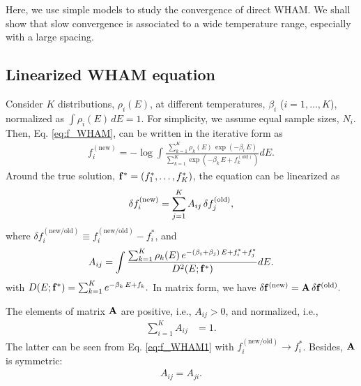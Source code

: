 \documentclass[reprint,aip,jcp,superscriptaddress]{revtex4-1}
\begin{document}
Here, we use simple models
to study the convergence of direct WHAM.
%
We shall show that
slow convergence is
associated to a wide temperature range,
especially with a large spacing.





\subsection{Linearized WHAM equation}



Consider $K$ distributions, $\rho_i(E)$,
at different temperatures,
$\beta_i$ ($i = 1, \dots, K$),
%
normalized as
%
$
\int \rho_i(E) \, dE = 1.
$
%
%
%
For simplicity,
we assume equal sample sizes, $N_i$.
%
Then,
Eq. \eqref{eq:f_WHAM},
can be written
in the iterative form as
%
\begin{align}
f_i^\mathrm{(new)}
=
-\log
\int
\frac
{
  \sum_{k=1}^K \rho_k(E) \, \exp(-\beta_i \, E)
}
{
  \sum_{k=1}^K
  \exp(
    -\beta_k \, E + f_k^\mathrm{(old)}
  )
}
dE.
\label{eq:f_WHAM1}
\end{align}
%
Around the true solution,
$\mathbf{f}^* = (f_1^*, \dots, f_K^*)$,
the equation can be linearized as
%
\begin{align}
\delta f_i^\mathrm{(new)}
=
\sum_{j = 1}^K
A_{ij} \,
\delta f_j^\mathrm{(old)},
\notag
\end{align}
%
where
%
$\delta f_i^\mathrm{(new/old)}
\equiv f_i^\mathrm{(new/old)} - f_i^*$,
%
and
\begin{align}
  A_{ij}
=
\int
\frac
{
  \sum_{k=1}^K \rho_k(E) \,
    e^{
      -(\beta_i + \beta_j) \, E + f_i^* + f_j^*
    }
}
{
  D^2(E; \mathbf{f}^*)
}
dE.
\label{eq:Aij}
\end{align}
%
with
$
D(E; \mathbf{f}^*)
=
\sum_{k = 1}^K
  e^{
    -\beta_k \, E + f_k
  }.
$
%
In matrix form, we have
%
$
\delta \mathbf{f}^\mathrm{(new)}
=
\mathbf{A} \,
\delta \mathbf{f}^\mathrm{(old)}.
$



The elements of matrix $\mathbf{A}$
are positive, i.e.,
%
$A_{ij} > 0$,
and normalized, i.e.,
%
\begin{align}
\sum_{i = 1}^K A_{ij} &= 1.
\label{eq:Aij_normalization}
\end{align}
%
The latter can be seen from
Eq. \eqref{eq:f_WHAM1}
with
$f_i^\mathrm{(new/old)} \rightarrow f_i^*$.
%
Besides,
$\mathbf{A}$ is symmetric:
%
\begin{align}
  A_{ij} = A_{ji}.
\label{eq:Aij_symmetry}
\end{align}
%
\end{document}
